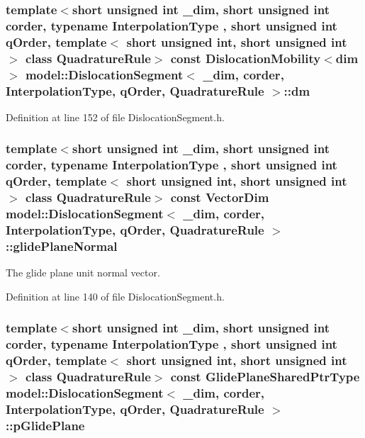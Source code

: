 \subsubsection[{dm}]{\setlength{\rightskip}{0pt plus 5cm}template$<$short unsigned int \+\_\+dim, short unsigned int corder, typename Interpolation\+Type , short unsigned int q\+Order, template$<$ short unsigned int, short unsigned int $>$ class Quadrature\+Rule$>$ const {\bf Dislocation\+Mobility}$<${\bf dim}$>$ {\bf model\+::\+Dislocation\+Segment}$<$ \+\_\+dim, corder, Interpolation\+Type, q\+Order, Quadrature\+Rule $>$\+::dm}\label{classmodel_1_1_dislocation_segment_a0a586fde05405666253129b2a4534f7a}


Definition at line 152 of file Dislocation\+Segment.\+h.

\hypertarget{classmodel_1_1_dislocation_segment_ae2dd6f1c724afc75fb90ab7b16e74ece}{}
\subsubsection[{glide\+Plane\+Normal}]{\setlength{\rightskip}{0pt plus 5cm}template$<$short unsigned int \+\_\+dim, short unsigned int corder, typename Interpolation\+Type , short unsigned int q\+Order, template$<$ short unsigned int, short unsigned int $>$ class Quadrature\+Rule$>$ const {\bf Vector\+Dim} {\bf model\+::\+Dislocation\+Segment}$<$ \+\_\+dim, corder, Interpolation\+Type, q\+Order, Quadrature\+Rule $>$\+::glide\+Plane\+Normal}\label{classmodel_1_1_dislocation_segment_ae2dd6f1c724afc75fb90ab7b16e74ece}


The glide plane unit normal vector. 



Definition at line 140 of file Dislocation\+Segment.\+h.

\hypertarget{classmodel_1_1_dislocation_segment_abbe811c4cccf916decfdc05562f9d4c4}{}
\subsubsection[{p\+Glide\+Plane}]{\setlength{\rightskip}{0pt plus 5cm}template$<$short unsigned int \+\_\+dim, short unsigned int corder, typename Interpolation\+Type , short unsigned int q\+Order, template$<$ short unsigned int, short unsigned int $>$ class Quadrature\+Rule$>$ const {\bf Glide\+Plane\+Shared\+Ptr\+Type} {\bf model\+::\+Dislocation\+Segment}$<$ \+\_\+dim, corder, Interpolation\+Type, q\+Order, Quadrature\+Rule $>$\+::p\+Glide\+Plane}\label{classmodel_1_1_dislocation_segment_abbe811c4cccf916decfdc05562f9d4c4}


